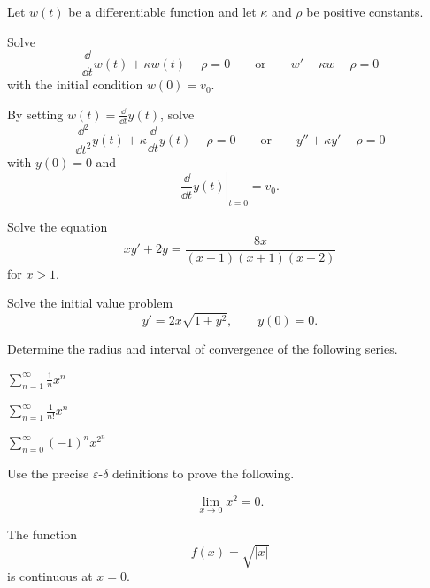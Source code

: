 \begin{problem}
Let $w(t)$ be a differentiable function and let $\kappa$ and $\rho$ be positive constants.
\begin{problemsubparts}
\item Solve
\[
\frac{\dd}{\dd t}w(t)+\kappa w(t)-\rho=0
\qquad\text{or}\qquad
w'+\kappa w-\rho=0
\]
with the initial condition $w(0)=v_0$.
\item By setting $w(t)=\displaystyle\frac{\dd}{\dd t}y(t)$, solve
\[
\frac{\dd^2}{\dd t^2}y(t)+\kappa\frac{\dd}{\dd t}y(t)-\rho=0
\qquad\text{or}\qquad
y''+\kappa y'-\rho=0
\]
with $y(0)=0$ and
\[
\left.\frac{\dd}{\dd t}y(t)\right|_{t=0}=v_0.
\]
\end{problemsubparts}
\end{problem}

\begin{problem}
\begin{problemchoices}
\item Solve the equation
\[
xy'+2y=\frac{8x}{(x-1)(x+1)(x+2)}
\]
for $x>1$.
\item Solve the initial value problem
\[
y'=2x\sqrt{1+y^2},
\qquad y(0)=0.
\]
\end{problemchoices}
\end{problem}

\begin{problem}
Determine the radius and interval of convergence of the following series.
\begin{problemchoices}
\item $\displaystyle\sum_{n=1}^{\infty}\frac1n x^n$
\item $\displaystyle\sum_{n=1}^{\infty}\frac1{n!}x^n$
\item $\displaystyle\sum_{n=0}^{\infty}(-1)^n x^{2^n}$
\end{problemchoices}
\end{problem}

\begin{problem}
Use the precise $\varepsilon$-$\delta$ definitions to prove the following.
\begin{problemsubparts}
\item
\[
\lim_{x\to0}x^2=0.
\]
\item The function
\[
f(x)=\sqrt{|x|}
\]
is continuous at $x=0$.
\end{problemsubparts}
\end{problem}

